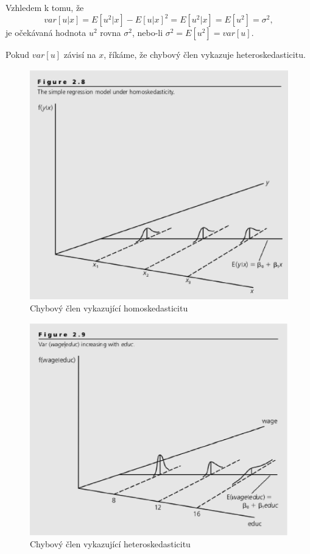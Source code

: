 Vzhledem k tomu, že
\begin{equation}
var[u|x] = E[u^2|x] - E[u|x]^2 = E[u^2|x] = E[u^2] = \sigma^2,
\end{equation}
je očekávaná hodnota $u^2$ rovna $\sigma^2$, nebo-li $\sigma^2 = E[u^2] = var[u]$.

Pokud $var[u]$ závisí na $x$, říkáme, že chybový člen vykazuje heteroskedasticitu.

\begin{figure}[htp]
\centering
\includegraphics[scale = 0.5]{pictures/figure_2_8.eps}
\caption{Chybový člen vykazující homoskedasticitu}
\label{figure_2_6}
\end{figure} 

\begin{figure}[htp]
\centering
\includegraphics[scale = 0.5]{pictures/figure_2_9.eps}
\caption{Chybový člen vykazující heteroskedasticitu}
\label{figure_2_6}
\end{figure} 


